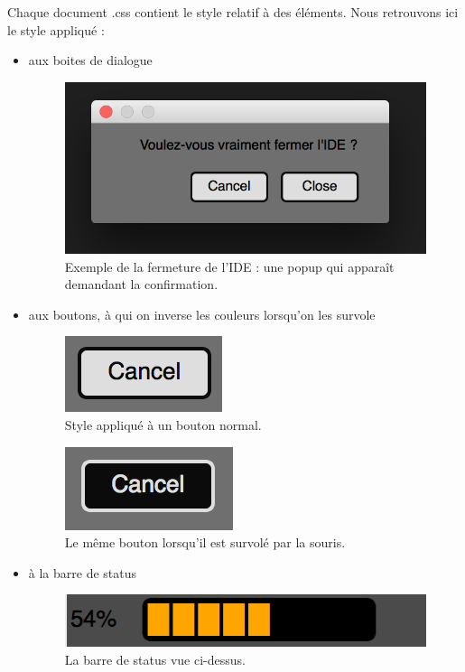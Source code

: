 \documentclass[a4paper,12pt]{article}
\begin{document}
		Chaque document .css contient le style relatif à des éléments. Nous retrouvons ici le style appliqué :
		
		\begin{itemize}
			\item aux boites de dialogue
				\begin{figure}[h!]
					\begin{center}
						\includegraphics[scale=0.4]{imgs/quit}
						\caption{ Exemple de la fermeture de l'IDE : une popup qui apparaît demandant la confirmation.}
					\end{center}
				\end{figure}
				
			\item aux boutons, à qui on inverse les couleurs lorsqu'on les survole
				\begin{figure}[h!]
					\begin{center}
						\includegraphics[scale=1]{imgs/bout1}
						\caption{Style appliqué à un bouton normal.}
					\end{center}
				\end{figure}
				\begin{figure}[h!]
					\begin{center}
						\includegraphics[scale=1]{imgs/bout2}
						\caption{Le même bouton lorsqu'il est survolé par la souris.}
					\end{center}
				\end{figure}
				
			\item à la barre de status
			\begin{figure}[h!]
					\begin{center}
						\includegraphics[scale=0.7]{imgs/progress2}
						\caption{La barre de status vue ci-dessus.}
					\end{center}
				\end{figure}
		\end{itemize}
		
\end{document}
